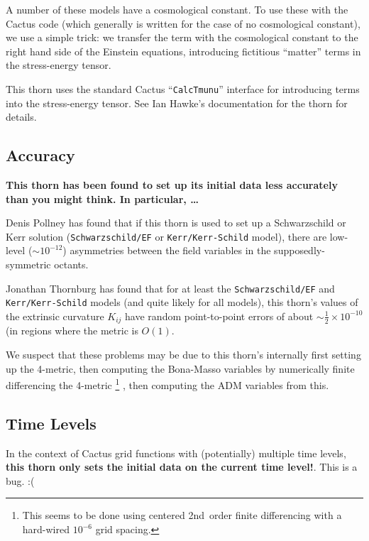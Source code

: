 A number of these models have a cosmological constant.  To use these
with the Cactus code (which generally is written for the case of no
cosmological constant), we use a simple trick: we transfer the term
with the cosmological constant to the right hand side of the Einstein
equations, introducing fictitious ``matter'' terms in the stress-energy 
tensor.

This thorn uses the standard Cactus ``\verb|CalcTmunu|'' interface
for introducing terms into the stress-energy tensor.  See Ian Hawke's
documentation for the  thorn for details.


\subsection{Accuracy}

\begingroup
\bf{}
This thorn has been found to set up its initial data less accurately
than you might think.  In particular, \dots

Denis Pollney has found that if this thorn is used to set up a
Schwarzschild or Kerr solution
(\verb|Schwarzschild/EF| or \verb|Kerr/Kerr-Schild| model),
there are low-level ($\sim 10^{-12}$) asymmetries between the
field variables in the supposedly-symmetric octants.

Jonathan Thornburg has found that for at least the \verb|Schwarzschild/EF|
and \verb|Kerr/Kerr-Schild| models (and quite likely for all models),
this thorn's values of the extrinsic curvature $K_{ij}$ have random
point-to-point errors of about $\sim {\textstyle\frac{1}{2}} \times 10^{-10}$
(in regions where the metric is $O(1)$.
\endgroup

We suspect that these problems may be due to this thorn's internally
first setting up the 4-metric, then computing the Bona-Masso variables
by numerically finite differencing the 4-metric%
\footnote{%
	 This seems to be done using centered
	 2nd~order finite differencing with a
	 hard-wired $10^{-6}$ grid spacing.
	 }%
, then computing the ADM variables from this.


\subsection{Time Levels}

In the context of Cactus grid functions with (potentially) multiple
time levels,
\textbf{this thorn only sets the initial data on the current time level!}.
This is a bug. :(

